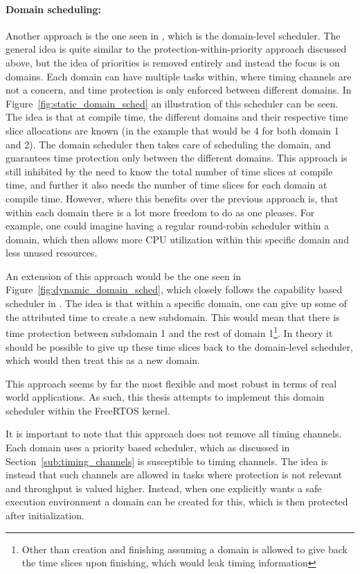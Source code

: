 \paragraph{Domain scheduling:}
Another approach is the one seen in \cite{ge2019}, which is the domain-level
scheduler. The general idea is quite similar to the protection-within-priority
approach discussed above, but
the idea of priorities is removed entirely and instead the focus is on
domains. Each domain can have multiple tasks within, where timing channels are
not a concern, and time protection is only enforced between different
domains. In Figure~\ref{fig:static_domain_sched} an illustration of this
scheduler can be seen. The idea is that at compile time, the different
domains and their respective time slice allocations are known (in the example that
would be 4 for both domain 1 and 2). The domain scheduler then takes care of
scheduling the domain, and guarantees time protection only between the
different domains. This approach is still inhibited by the need to know the
total number of time slices at compile time, and further it also needs the
number of time slices for each domain at compile time. However, where this
benefits over the previous approach is, that within each domain there is a lot
more freedom to do as one pleases. For example, one could imagine having a regular
round-robin scheduler within a domain, which then allows more CPU utilization
within this specific domain and less unused resources.  

An extension of this approach would be the one seen in
Figure~\ref{fig:dynamic_domain_sched}, which closely follows the capability
based scheduler in \cite{karlsson2025}. The idea is that within a specific
domain, one can give up some of the attributed time to create a new subdomain.
This would mean that there is time protection between subdomain 1 and the rest
of domain 1\footnote{Other than creation and finishing assuming a domain is
  allowed to give back the time slices upon finishing, which would leak timing
information}. In theory it should be possible to give up these time slices back
to the domain-level scheduler, which would then treat this as a new domain.

This approach seems by far the most flexible and most robust in terms of real
world applications. As such, this thesis attempts to implement this domain
scheduler within the FreeRTOS kernel.

It is important to note that this approach does not remove all timing channels.
Each domain uses a priority based scheduler, which as discussed in
Section~\ref{sub:timing_channels} is susceptible to timing channels. The idea
is instead that such channels are allowed in tasks where protection is not
relevant and throughput is valued higher. Instead, when one explicitly wants a
safe execution environment a domain can be created for this, which is then
protected after initialization.


